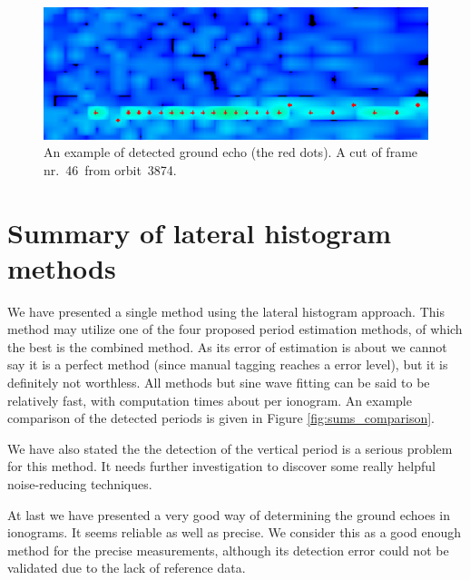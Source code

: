 \begin{figure}
	\centering
	\includegraphics[width=140mm]{images/ground_echo_detected.png}
	\caption{An example of detected ground echo (the red dots). A cut of frame nr.~46~from orbit~3874.}
	\label{fig:ground_echo_detected}
\end{figure}

\section{Summary of lateral histogram methods}
We have presented a single method using the lateral histogram approach. This method may utilize one of the four proposed period estimation methods, of which the best is the combined method. As its error of estimation is about  we cannot say it is a perfect method (since manual tagging reaches a  error level), but it is definitely not worthless. All methods but sine wave fitting can be said to be relatively fast, with computation times about  per ionogram. An example comparison of the detected periods is given in Figure \ref{fig:sums_comparison}.

We have also stated the the detection of the vertical period is a serious problem for this method. It needs further investigation to discover some really helpful noise-reducing techniques.

At last we have presented a very good way of determining the ground echoes in ionograms. It seems reliable as well as precise. We consider this as a good enough method for the precise measurements, although its detection error could not be validated due to the lack of reference data.

